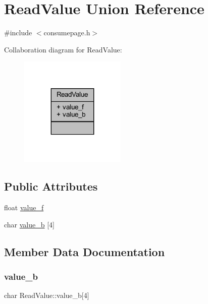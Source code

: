 \hypertarget{union_read_value}{}\section{Read\+Value Union Reference}
\label{union_read_value}


{\ttfamily \#include $<$consumepage.\+h$>$}



Collaboration diagram for Read\+Value\+:
\nopagebreak
\begin{figure}[H]
\begin{center}
\leavevmode
\includegraphics[width=143pt]{union_read_value__coll__graph}
\end{center}
\end{figure}
\subsection*{Public Attributes}
\begin{DoxyCompactItemize}
\item 
float \mbox{\hyperlink{union_read_value_aaf8c28a424fb6f23198e7a18b87785c9}{value\+\_\+f}}
\item 
char \mbox{\hyperlink{union_read_value_a3158d6274c518aa6a0b8e0c2365d27dc}{value\+\_\+b}} \mbox{[}4\mbox{]}
\end{DoxyCompactItemize}


\subsection{Member Data Documentation}
\mbox{\label{union_read_value_a3158d6274c518aa6a0b8e0c2365d27dc}} 
\subsubsection{\texorpdfstring{value\_b}{value\_b}}
{\footnotesize\ttfamily char Read\+Value\+::value\+\_\+b\mbox{[}4\mbox{]}}

